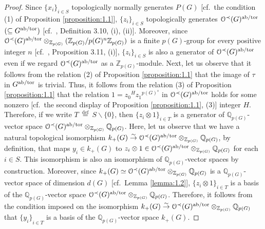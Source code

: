 \documentclass[12pt,showkeys]{amsart}
\theoremstyle{theorem}
\theoremstyle{definition}
\def\bZ{{\mathbb Z}}
\def\bQ{{\mathbb Q}}
\def\CalO{{\mathcal O}}
\def\defeq{ \ {\stackrel{\mathrm{def}}{=}} \ }
\begin{document}
\begin{proof}
Since ${\{x_i\} }_{i \in S}$ topologically normally generates $P(G)$ [cf.\ the condition (1) of Proposition \ref{proposition:1.1}], ${\{z_i\} }_{i \in S}$ topologically generates $\CalO^{\prec}(G)^{\rm ab/tor}$ $( \subseteq G^{\rm ab/tor} )$ [cf.\ \cite{Hoshi1}, Definition 3.10, (i), (ii)]. Moreover, since $\CalO^{\prec}(G)^{\rm ab/tor} \otimes_{\mathbb{Z}_{p(G)}} (\mathbb{Z}_{p(G)} / p(G)^n\mathbb{Z}_{p(G)})$ is a finite $p(G)$-group for every positive integer $n$ [cf.\ \cite{Hoshi1}, Proposition 3.11, (i)], ${\{z_i\} }_{i \in S}$ is also a generator of $\CalO^{\prec}(G)^{\rm ab/tor}$ even if we regard $\CalO^{\prec}(G)^{\rm ab/tor}$ as a $\bZ_{p(G)}$-module. Next, let us observe that it follows from the relation (2) of Proposition \ref{proposition:1.1} that the image of $\tau$ in $G^{\rm ab/tor}$ is trivial. Thus, it follows from the relation (3) of Proposition \ref{proposition:1.1} that the relation $1={z_0}^{H}{z_1}^{{p(G)}^s}$ in $\CalO^{\prec}(G)^{\rm ab/tor}$ holds for some nonzero [cf.\ the second display of Proposition \ref{proposition:1.1}, (3)] integer $H$. Therefore, if we write $T \defeq S \backslash \{0\}$, then ${\{z_i \otimes 1 \} }_{i \in T}$ is a generator of $\bQ_{p(G)}$-vector space $\CalO^{\prec}(G)^{\rm ab/tor} \otimes_{\bZ_{p(G)}}  \bQ_{p(G)}$. Here, let us observe that we have a natural topological isomorphism $k_{+}(G) \stackrel{\sim}{\to} \CalO^{\prec}(G)^{\rm ab/tor} \otimes_{\bZ_{p(G)}}  \bQ_{p(G)}$, by definition, that maps $y_i \in k_{+}(G)$ to $z_i \otimes 1 \in  \CalO^{\prec}(G)^{\rm ab/tor} \otimes_{\bZ_{p(G)}} \bQ_{p(G)}$ for each $i \in S$. This isomorphism is also an isomorphism of $\bQ_{p(G)}$-vector spaces by construction. Moreover, since $k_{+}(G) \simeq \CalO^{\prec}(G)^{\rm ab/tor} \otimes_{\bZ_{p(G)}}  \bQ_{p(G)}$ is a $\bQ_{p(G)}$-vector space of dimension $d(G)$ [cf.\ Lemma \ref{lemma:1.2}], ${\{{z_i} \otimes 1 \} }_{i \in T}$ is a basis of the $\bQ_{p(G)}$-vector space $\CalO^{\prec}(G)^{\rm ab/tor} \otimes_{\bZ_{p(G)}}  \bQ_{p(G)}$. Therefore, it follows from the condition imposed on the isomorphism $k_{+}(G) \stackrel{\sim}{\to} \CalO^{\prec}(G)^{\rm ab/tor} \otimes_{\bZ_{p(G)}}  \bQ_{p(G)}$ that ${\{y_i\} }_{i \in T}$ is a basis of the $\bQ_{p(G)}$-vector space $k_{+}(G)$. 
\end{proof}
\end{document}
